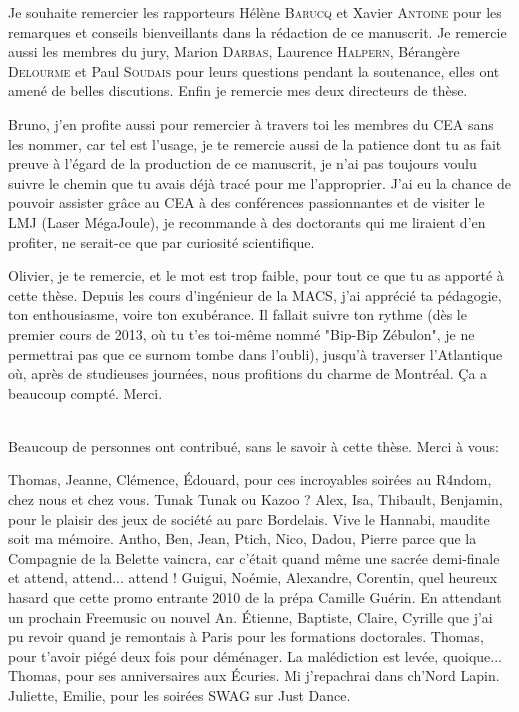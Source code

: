 
Je souhaite remercier les rapporteurs \pr{} Hélène \textsc{Barucq} et \pr{} Xavier \textsc{Antoine} pour les remarques et conseils bienveillants dans la rédaction de ce manuscrit.
Je remercie aussi les membres du jury, \pr{} Marion \textsc{Darbas}, \pr{} Laurence \textsc{Halpern}, \dr{} Bérangère \textsc{Delourme} et \dr{} Paul \textsc{Soudais} pour leurs questions pendant la soutenance, elles ont amené de belles discutions.
Enfin je remercie mes deux directeurs de thèse.

Bruno, j'en profite aussi pour remercier à travers toi les membres du CEA sans les nommer, car tel est l'usage, je te remercie aussi de la patience dont tu as fait preuve à l'égard de la production de ce manuscrit, je n'ai pas toujours voulu suivre le chemin que tu avais déjà tracé pour me l'approprier.
J'ai eu la chance de pouvoir assister grâce au CEA à des conférences passionnantes et de visiter le LMJ (Laser MégaJoule), je recommande à des doctorants qui me liraient d'en profiter, ne serait-ce que par curiosité scientifique.

Olivier, je te remercie, et le mot est trop faible, pour tout ce que tu as apporté à cette thèse. 
Depuis les cours d'ingénieur de la MACS, j'ai apprécié ta pédagogie, ton enthousiasme, voire ton exubérance. Il fallait suivre ton rythme (dès le premier cours de 2013, où tu t'es toi-même nommé "Bip-Bip Zébulon", je ne permettrai pas que ce surnom tombe dans l'oubli), jusqu'à traverser l'Atlantique où, après de studieuses journées, nous profitions du charme de Montréal.
Ça a beaucoup compté. Merci.

~{}\\

Beaucoup de personnes ont contribué, sans le savoir à cette thèse. Merci à vous:

Thomas, Jeanne, Clémence, Édouard, pour ces incroyables soirées au R4ndom, chez nous et chez vous. Tunak Tunak ou Kazoo ? 
Alex, Isa, Thibault, Benjamin, pour le plaisir des jeux de société au parc Bordelais. Vive le Hannabi, maudite soit ma mémoire.
Antho, Ben, Jean, Ptich, Nico, Dadou, Pierre parce que la Compagnie de la Belette vaincra, car c'était quand même une sacrée demi-finale et attend, attend... attend !
Guigui, Noémie, Alexandre, Corentin, quel heureux hasard que cette promo entrante 2010 de la prépa Camille Guérin. En attendant un prochain Freemusic ou nouvel An.
Étienne, Baptiste, Claire, Cyrille que j'ai pu revoir quand je remontais à Paris pour les formations doctorales.
Thomas, pour t'avoir piégé deux fois pour déménager. La malédiction est levée, quoique...
Thomas, pour ses anniversaires aux Écuries. Mi j'repachrai dans ch'Nord Lapin.
Juliette, Emilie, pour les soirées SWAG sur Just Dance.


